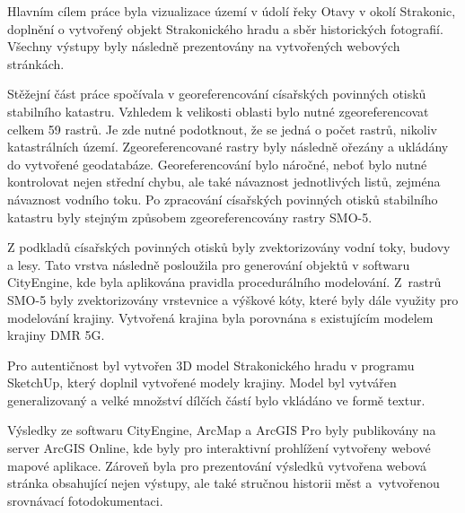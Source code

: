 \documentclass[thesis=M,czech]{FITthesis}[2012/06/26]
\begin{document}
\begin{conclusion}
Hlavním cílem práce byla vizualizace území v údolí řeky Otavy v okolí Strakonic, doplnění o vytvořený objekt Strakonického hradu a sběr historických fotografií. Všechny výstupy byly následně prezentovány na vytvořených webových stránkách.

Stěžejní část práce spočívala v georeferencování císařských povinných otisků stabilního katastru. Vzhledem k velikosti oblasti bylo nutné zgeoreferencovat celkem 59 rastrů. Je zde nutné podotknout, že se jedná o počet rastrů, nikoliv katastrálních území. Zgeoreferencované rastry byly následně ořezány a ukládány do vytvořené geodatabáze. Georeferencování bylo náročné, neboť bylo nutné kontrolovat nejen střední chybu, ale také návaznost jednotlivých listů, zejména návaznost vodního toku. Po zpracování císařských povinných otisků stabilního katastru byly stejným způsobem zgeoreferencovány rastry SMO-5. 

Z podkladů císařských povinných otisků byly zvektorizovány vodní toky, budovy a lesy. Tato vrstva následně posloužila pro generování objektů v softwaru CityEngine, kde byla aplikována pravidla procedurálního modelování. Z~rastrů SMO-5 byly zvektorizovány vrstevnice a výškové kóty, které byly dále využity pro modelování krajiny. Vytvořená krajina byla porovnána s existujícím modelem krajiny DMR 5G. 

Pro autentičnost byl vytvořen 3D model Strakonického hradu v programu SketchUp, který doplnil vytvořené modely krajiny. Model byl vytvářen generalizovaný a velké množství dílčích částí bylo vkládáno ve formě textur.

Výsledky ze softwaru CityEngine, ArcMap a ArcGIS Pro byly publikovány na server ArcGIS Online, kde byly pro interaktivní prohlížení vytvořeny webové mapové aplikace. Zároveň byla pro prezentování výsledků vytvořena webová stránka obsahující nejen výstupy, ale také stručnou historii měst a~vytvořenou srovnávací fotodokumentaci.





\end{conclusion}




\appendix
\end{document}
